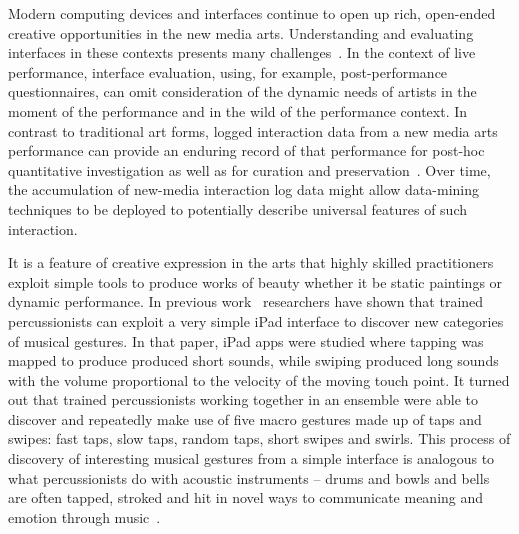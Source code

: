 \documentclass{sigchi}
\begin{document}
Modern computing devices and interfaces continue to open up rich,
open-ended creative opportunities in the new media arts. Understanding
and evaluating interfaces in these contexts presents many
challenges~\cite{Resnick:2005yu,Shneiderman:2007qv}. In the context of
live performance, interface evaluation, using, for example,
post-performance questionnaires, can omit consideration of the dynamic
needs of artists in the moment of the performance and in the wild of
the performance context. In contrast to traditional art forms, logged
interaction data from a new media arts performance can provide an
enduring record of that performance for post-hoc quantitative
investigation as well as for curation and
preservation~\cite{England:2014ys}. Over time, the accumulation of
new-media interaction log data might allow data-mining techniques to
be deployed to potentially describe universal features of such
interaction.


It is a feature of creative expression in the arts that highly skilled
practitioners exploit simple tools to produce works of beauty whether
it be static paintings or dynamic performance. In previous
work~\cite{Martin:2014cr} researchers have shown that trained
percussionists can exploit a very simple iPad interface to discover
new categories of musical gestures. In that paper, iPad apps were
studied where tapping was mapped to produce produced short sounds,
while swiping produced long sounds with the volume proportional to the
velocity of the moving touch point. It turned out that trained
percussionists working together in an ensemble were able to discover
and repeatedly make use of five macro gestures made up of taps and
swipes: fast taps, slow taps, random taps, short swipes and swirls.
This process of discovery of interesting musical gestures from a
simple interface is analogous to what percussionists do with acoustic
instruments -- drums and bowls and bells are often tapped, stroked and
hit in novel ways to communicate meaning and emotion through
music~\cite{Schick:2006fk}.
\end{document}
